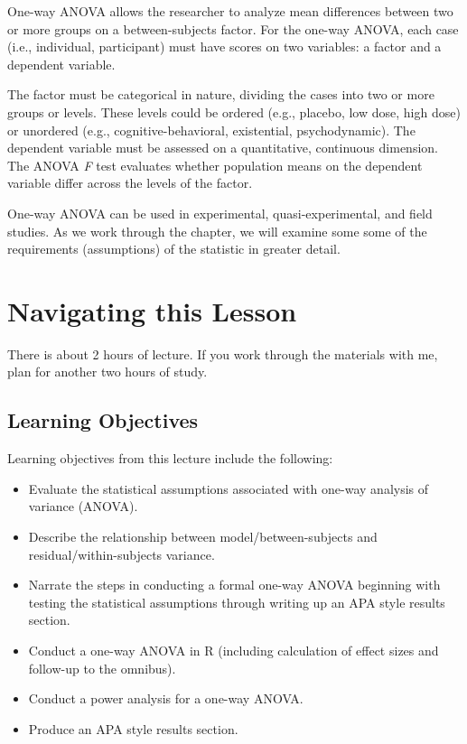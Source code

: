 \documentclass[
  11pt,
]{book}
\providecommand{\tightlist}{%
  \setlength{\itemsep}{0pt}\setlength{\parskip}{0pt}}
\begin{document}
One-way ANOVA allows the researcher to analyze mean differences between two or more groups on a between-subjects factor. For the one-way ANOVA, each case (i.e., individual, participant) must have scores on two variables: a factor and a dependent variable.

The factor must be categorical in nature, dividing the cases into two or more groups or levels. These levels could be ordered (e.g., placebo, low dose, high dose) or unordered (e.g., cognitive-behavioral, existential, psychodynamic). The dependent variable must be assessed on a quantitative, continuous dimension. The ANOVA \emph{F} test evaluates whether population means on the dependent variable differ across the levels of the factor.

One-way ANOVA can be used in experimental, quasi-experimental, and field studies. As we work through the chapter, we will examine some some of the requirements (assumptions) of the statistic in greater detail.

\hypertarget{navigating-this-lesson-5}{%
\section{Navigating this Lesson}\label{navigating-this-lesson-5}}

There is about 2 hours of lecture. If you work through the materials with me, plan for another two hours of study.

\hypertarget{learning-objectives-5}{%
\subsection{Learning Objectives}\label{learning-objectives-5}}

Learning objectives from this lecture include the following:

\begin{itemize}
\tightlist
\item
  Evaluate the statistical assumptions associated with one-way analysis of variance (ANOVA).
\item
  Describe the relationship between model/between-subjects and residual/within-subjects variance.
\item
  Narrate the steps in conducting a formal one-way ANOVA beginning with testing the statistical assumptions through writing up an APA style results section.
\item
  Conduct a one-way ANOVA in R (including calculation of effect sizes and follow-up to the omnibus).
\item
  Conduct a power analysis for a one-way ANOVA.
\item
  Produce an APA style results section.
\end{itemize}
\end{document}
